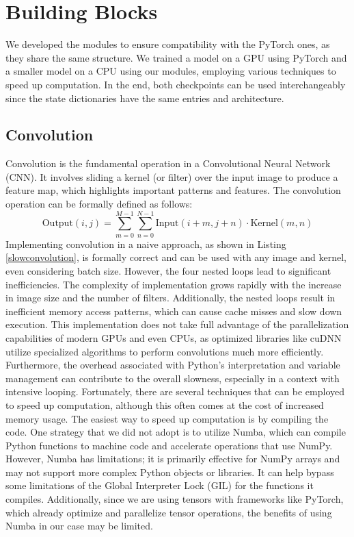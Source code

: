 \documentclass[../report.tex]{subfiles}
\begin{document}
	\section{Building Blocks}
	We developed the modules to ensure compatibility with the PyTorch ones, as they share the same structure. We trained a model on a GPU using PyTorch and a smaller model on a CPU using our modules, employing various techniques to speed up computation. In the end, both checkpoints can be used interchangeably since the state dictionaries have the same entries and architecture.
\subsection{Convolution}
Convolution is the fundamental operation in a Convolutional Neural Network (CNN). It involves sliding a kernel (or filter) over the input image to produce a feature map, which highlights important patterns and features. The convolution operation can be formally defined as follows:
\begin{equation}
	\text{Output}(i, j) = \sum_{m=0}^{M-1} \sum_{n=0}^{N-1} \text{Input}(i + m, j + n) \cdot \text{Kernel}(m, n)
\end{equation}
Implementing convolution in a naive approach, as shown in Listing \ref{slowconvolution}, is formally correct and can be used with any image and kernel, even considering batch size. However, the four nested loops lead to significant inefficiencies. The complexity of implementation grows rapidly with the increase in image size and the number of filters. 
Additionally, the nested loops result in inefficient memory access patterns, which can cause cache misses and slow down execution. This implementation does not take full advantage of the parallelization capabilities of modern GPUs and even CPUs, as optimized libraries like cuDNN utilize specialized algorithms to perform convolutions much more efficiently. Furthermore, the overhead associated with Python's interpretation and variable management can contribute to the overall slowness, especially in a context with intensive looping.
Fortunately, there are several techniques that can be employed to speed up computation, although this often comes at the cost of increased memory usage.
The easiest way to speed up computation is by compiling the code. One strategy that we did not adopt is to utilize Numba, which can compile Python functions to machine code and accelerate operations that use NumPy. However, Numba has limitations; it is primarily effective for NumPy arrays and may not support more complex Python objects or libraries. It can help bypass some limitations of the Global Interpreter Lock (GIL) for the functions it compiles. Additionally, since we are using tensors with frameworks like PyTorch, which already optimize and parallelize tensor operations, the benefits of using Numba in our case may be limited.
\end{document}
